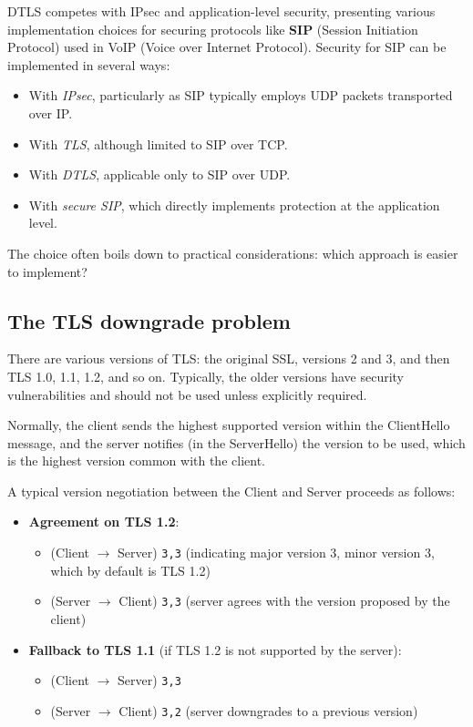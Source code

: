 DTLS competes with IPsec and application-level security, presenting various implementation choices for securing protocols like \textbf{SIP} (Session Initiation Protocol) used in VoIP (Voice over Internet Protocol).
Security for SIP can be implemented in several ways:
\begin{itemize}
    \item With \textit{IPsec}, particularly as SIP typically employs UDP packets transported over IP.
    \item With \textit{TLS}, although limited to SIP over TCP.
    \item With \textit{DTLS}, applicable only to SIP over UDP.
    \item With \textit{secure SIP}, which directly implements protection at the application level.
\end{itemize}

The choice often boils down to practical considerations: which approach is easier to implement?



\subsection{The TLS downgrade problem}

There are various versions of TLS: the original SSL, versions 2 and 3, and then TLS 1.0, 1.1, 1.2, and so on. Typically, the older versions have security vulnerabilities and should not be used unless explicitly required.

Normally, the client sends the highest supported version within the ClientHello message, and the server notifies (in the ServerHello) the version to be used, which is the highest version common with the client.

A typical version negotiation between the Client and Server proceeds as follows:
\begin{itemize}
    \item \textbf{Agreement on TLS 1.2}:
          \begin{itemize}
              \item (Client $\rightarrow$ Server) \texttt{3,3} (indicating major version 3, minor version 3, which by default is TLS 1.2)
              \item (Server $\rightarrow$ Client) \texttt{3,3} (server agrees with the version proposed by the client)
          \end{itemize}
    \item \textbf{Fallback to TLS 1.1} (if TLS 1.2 is not supported by the server):
          \begin{itemize}
              \item (Client $\rightarrow$ Server) \texttt{3,3}
              \item (Server $\rightarrow$ Client) \texttt{3,2} (server downgrades to a previous version)
          \end{itemize}
\end{itemize}


